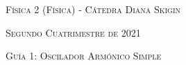 \documentclass[11pt,spanish]{article}
\begin{document}
    \begin{center}
    \textsc{\large Física 2 (Física) - Cátedra Diana Skigin}
    \par\end{center}{\large \par}
    
    \begin{center}
    \textsc{\large Segundo Cuatrimestre de 2021}
    \par\end{center}{\large \par}
    
    \begin{center}
    \textsc{\large Guía 1: Oscilador Armónico Simple}
    \par\end{center}{\large \par}
\end{document}
